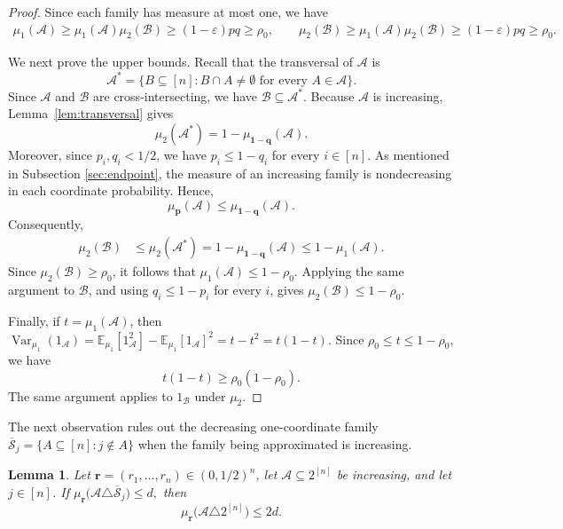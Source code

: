 \documentclass[11pt]{article}
\numberwithin{equation}{section}
\newtheorem{lemma}[theorem]{Lemma}
\theoremstyle{definition}
\theoremstyle{remark}
\begin{document}
\begin{proof}
Since each family has measure at most one, we have
$$
\begin{aligned}
\mu_1(\mathcal A)
\geq
\mu_1(\mathcal A)\mu_2(\mathcal B)
\geq
(1-\varepsilon)pq
\geq\rho_0,\qquad
\mu_2(\mathcal B)
\geq
\mu_1(\mathcal A)\mu_2(\mathcal B)
\geq
(1-\varepsilon)pq
\geq\rho_0.
\end{aligned}
$$

We next prove the upper bounds. Recall that the transversal of
$\mathcal A$ is
$$
\mathcal A^*
=
\{B\subseteq[n]:
B\cap A\neq\emptyset
\text{ for every }A\in\mathcal A\}.
$$
Since $\mathcal A$ and $\mathcal B$ are cross-intersecting, we have
$\mathcal B\subseteq\mathcal A^*$. Because $\mathcal A$ is
increasing, Lemma~\ref{lem:transversal} gives
$$
\mu_2(\mathcal A^*)
=
1-\mu_{\mathbf 1-\mathbf q}(\mathcal A).
$$
Moreover, since $p_i,q_i<1/2$, we have
$p_i\leq1-q_i$ for every $i\in[n]$. As mentioned in Subsection \ref{sec:endpoint}, the measure of an increasing
family is nondecreasing in each coordinate probability.
Hence,
$$
\mu_{\mathbf p}(\mathcal A)
\leq
\mu_{\mathbf 1-\mathbf q}(\mathcal A).
$$
Consequently,
$$
\begin{aligned}
\mu_2(\mathcal B)
&\leq
\mu_2(\mathcal A^*)=
1-\mu_{\mathbf 1-\mathbf q}(\mathcal A)\leq
1-\mu_1(\mathcal A).
\end{aligned}
$$
Since $\mu_2(\mathcal B)\geq\rho_0$, it follows that
$\mu_1(\mathcal A)\leq1-\rho_0$. Applying the same argument to
$\mathcal B$, and using $q_i\leq1-p_i$ for every $i$, gives
$\mu_2(\mathcal B)\leq1-\rho_0$.

Finally, if $t=\mu_1(\mathcal A)$, then
$
\operatorname{Var}_{\mu_1}(1_{\mathcal A})
=
\mathbb E_{\mu_1}[1_{\mathcal A}^2]
-
\mathbb E_{\mu_1}[1_{\mathcal A}]^2=
t-t^2=
t(1-t).
$
Since $\rho_0\leq t\leq1-\rho_0$, we have
$$
t(1-t)\geq\rho_0(1-\rho_0).
$$
The same argument applies to $1_{\mathcal B}$ under $\mu_2$.
\end{proof}

The next observation rules out the decreasing one-coordinate family
$
\overline{\mathcal S}_j
=
\{A\subseteq[n]:j\notin A\}
$
when the family being approximated is increasing.

\begin{lemma}\label{lem:exclude-antistar}
Let $\mathbf r=(r_1,\ldots,r_n)\in(0,1/2)^n$, let
$\mathcal A\subseteq2^{[n]}$ be increasing, and let $j\in[n]$. If
$
\mu_{\mathbf r}
\bigl(\mathcal A\triangle\overline{\mathcal S}_j\bigr)
\leq d,
$
then
$$
\mu_{\mathbf r}
\bigl(\mathcal A\triangle2^{[n]}\bigr)
\leq2d.
$$
\end{lemma}
\end{document}
